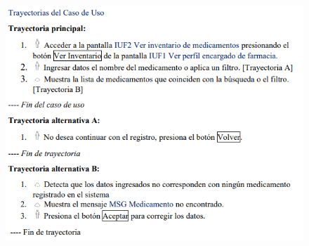 \documentclass[12pt,letterpaper]{article}
\begin{document}
            \begin{figure}[H]
                \centering
                \includegraphics [scale=0.9]{specs/trayVerInventario}
            \end{figure}
\end{document}

